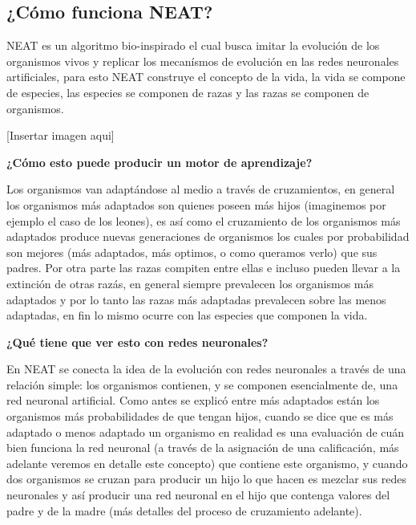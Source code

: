 \subsection{¿Cómo funciona NEAT?}

NEAT es un algoritmo bio-inspirado el cual busca imitar la evolución de los organismos vivos y replicar los mecanísmos de evolución en las redes neuronales artificiales, para esto NEAT construye el concepto de la vida, la vida se compone de especies, las especies se componen de razas y las razas se componen de organismos.\newline

[Insertar imagen aqui]\newline


\textbf{¿Cómo esto puede producir un motor de aprendizaje?}\newline


Los organismos van adaptándose al medio a través de cruzamientos, en general los organismos más adaptados son quienes poseen más hijos (imaginemos por ejemplo el caso de los leones), es así como el cruzamiento de los organismos más adaptados produce nuevas generaciones de organismos los cuales por probabilidad son mejores (más adaptados, más optimos, o como queramos verlo) que sus padres. Por otra parte las razas compiten entre ellas e incluso pueden llevar a la extinción de otras razás, en general siempre prevalecen los organismos más adaptados y por lo tanto las razas más adaptadas prevalecen sobre las menos adaptadas, en fin lo mismo ocurre con las especies que componen la vida.\newline


\textbf{¿Qué tiene que ver esto con redes neuronales?} \newline


En NEAT se conecta la idea de la evolución con redes neuronales a través de una relación simple: los organismos contienen, y se componen esencialmente de, una red neuronal artificial. Como antes se explicó entre más adaptados están los organismos más probabilidades de que tengan hijos, cuando se dice que es más adaptado o menos adaptado un organismo en realidad es una evaluación de cuán bien funciona la red neuronal (a través de la asignación de una calificación, más adelante veremos en detalle este concepto) que contiene este organismo, y cuando dos organismos se cruzan para producir un hijo lo que hacen es mezclar sus redes neuronales y así producir una red neuronal en el hijo que contenga valores del padre y de la madre (más detalles del proceso de cruzamiento adelante). \newline


\textbf{}\newline

